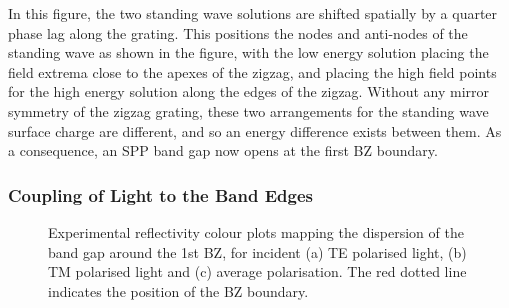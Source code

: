 In this figure, the two standing wave solutions are shifted spatially by a quarter phase lag along the grating. This positions the nodes and anti-nodes of the standing wave as shown in the figure, with the low energy solution placing the field extrema close to the apexes of the zigzag, and placing the high field points for the high energy solution along the edges of the zigzag. Without any mirror symmetry of the zigzag grating, these two arrangements for the standing wave surface  charge are different, and so an energy difference exists between them. As a consequence, an SPP band gap now opens at the first BZ boundary. 



\subsubsection{Coupling of Light to the Band Edges}

\begin{figure}
\begin{center}
\end{center}
\caption[Experimental reflectivity colour plots mapping the dispersion of the band gap around the 1st BZ.]{Experimental reflectivity colour plots mapping the dispersion of the band gap around the 1st BZ, for incident (a) TE polarised light, (b) TM polarised light and (c) average polarisation. The red dotted line indicates the position of the BZ boundary.\label{fig-asym-bandedges}}
\end{figure}

